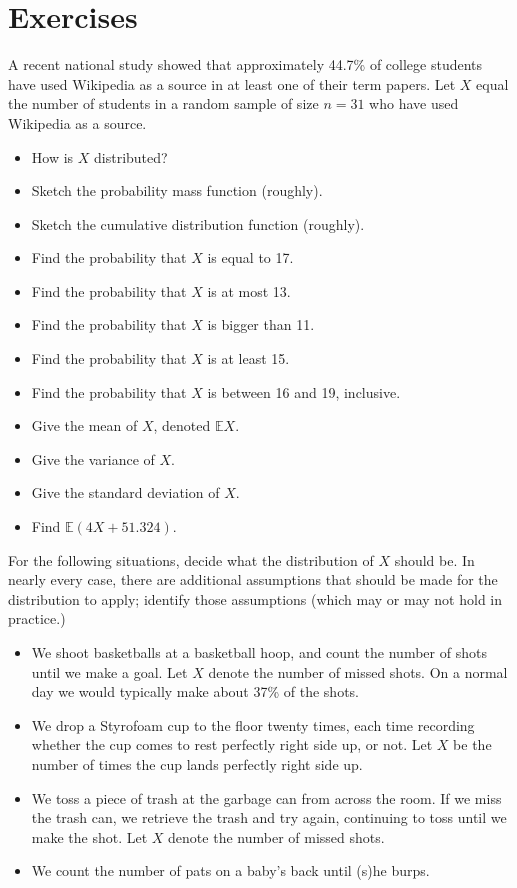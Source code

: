 \newpage{}

\section{Exercises}
\label{sec-5-8}
\setcounter{thm}{0}

\begin{xca}
A recent national study showed that approximately 44.7\% of college
students have used Wikipedia as a source in at least one of their term
papers. Let \(X\) equal the number of students in a random sample of
size \(n=31\) who have used Wikipedia as a source.
\begin{itemize}
\item How is \(X\) distributed?
\item Sketch the probability mass function (roughly).
\item Sketch the cumulative distribution function (roughly).
\item Find the probability that \(X\) is equal to 17.
\item Find the probability that \(X\) is at most 13.
\item Find the probability that \(X\) is bigger than 11.
\item Find the probability that \(X\) is at least 15.
\item Find the probability that \(X\) is between 16 and 19, inclusive.
\item Give the mean of \(X\), denoted \(\mathbb{E} X\).
\item Give the variance of \(X\).
\item Give the standard deviation of \(X\).
\item Find \(\mathbb{E}(4X + 51.324)\).
\end{itemize}
\end{xca}

\begin{xca}
For the following situations, decide what the distribution of \(X\)
should be. In nearly every case, there are additional assumptions that
should be made for the distribution to apply; identify those
assumptions (which may or may not hold in practice.)
\begin{itemize}
\item We shoot basketballs at a basketball hoop, and count the number of
shots until we make a goal. Let \(X\) denote the number of missed
shots. On a normal day we would typically make about 37\% of the
shots.
\item We drop a Styrofoam cup to the floor twenty times, each time
recording whether the cup comes to rest perfectly right side up, or
not. Let \(X\) be the number of times the cup lands perfectly right
side up.
\item We toss a piece of trash at the garbage can from across the room. If
we miss the trash can, we retrieve the trash and try again,
continuing to toss until we make the shot. Let \(X\) denote the
number of missed shots.
\item We count the number of pats on a baby's back until (s)he burps.
\end{itemize}
\end{xca}
